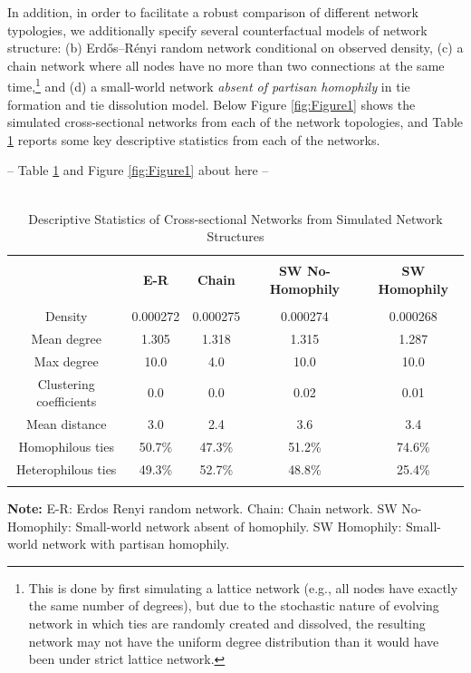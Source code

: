 \documentclass[man, 12pt, a4paper, noextraspace]{apa6}
\begin{document}
    In addition, in order to facilitate a robust comparison of different network typologies, we additionally specify several counterfactual models of network structure: (b) Erdős–Rényi random network conditional on observed density, (c) a chain network where all nodes have no more than two connections at the same time,\footnote{  This is done by first simulating a lattice network (e.g., all nodes have exactly the same number of degrees), but due to the stochastic nature of evolving network in which ties are randomly created and dissolved, the resulting network may not have the uniform degree distribution than it would have been under strict lattice network.} and (d) a small-world network \textit{absent of partisan homophily} in tie formation and tie dissolution model. Below Figure \ref{fig:Figure1} shows the simulated cross-sectional networks from each of the network topologies, and Table \ref{tab:Table1} reports some key descriptive statistics from each of the networks.
\begin{center} -- Table \ref{tab:Table1} and Figure \ref{fig:Figure1} about here -- \end{center}    
    
\begin{table}[!htbp] \centering 
  \caption{\\ Descriptive Statistics of Cross-sectional Networks from Simulated Network Structures} 
  \label{tab:Table1} 
\begin{tabular}{@{\extracolsep{5pt}} ccccc} 
\\[-1.8ex]\hline 
\hline \\[-1.8ex] 
 & \textbf{E-R} & \textbf{Chain} &  \textbf{SW No-Homophily} & \textbf{SW Homophily} \\ 
\hline \\[-1.8ex] 
Density & 0.000272 & 0.000275 & 0.000274 & 0.000268 \\ 
Mean degree & 1.305 & 1.318 & 1.315 & 1.287 \\ 
Max degree & 10.0 & 4.0 & 10.0 & 10.0 \\ 
Clustering coefficients & 0.0 & 0.0 & 0.02 & 0.01 \\ 
Mean distance & 3.0 & 2.4 & 3.6 & 3.4 \\ 
Homophilous ties & 50.7\% & 47.3\% & 51.2\% & 74.6\% \\ 
Heterophilous ties & 49.3\% & 52.7\% & 48.8\% & 25.4\% \\ 
\hline \\[-1.8ex]  
\end{tabular} 
\begin{tablenotes}
\small \vspace{0.15in}
\textbf{Note:} E-R: Erdos Renyi random network. Chain: Chain network. SW No-Homophily: Small-world network absent of homophily. SW Homophily: Small-world network with partisan homophily. 
\end{tablenotes}
\end{table} 
\end{document}
